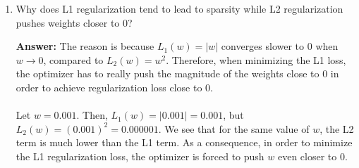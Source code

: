 \documentclass{article}
\newenvironment{QandA}{\begin{enumerate}[label=\arabic*.]}{\end{enumerate}}
\newenvironment{ListAlph}{\begin{enumerate}[label=(\alph*)]}{\end{enumerate}}
\newenvironment{answer}{\par\normalfont \textbf{Answer:}}{}
\newcommand{\Exp}[1]{\mathbb{E}\left[ #1 \right]}
\newcommand{\Cov}[1]{\text{Cov}\left[ #1 \right]}
\begin{document}
\begin{QandA}
\begin{answer}
\begin{ListAlph}
            Then, the error becomes:
            \begin{align*}
                \Exp{\left( \frac{1}{K} \sum_{k} \epsilon_k \right)^2} &= \frac{1}{K}v + \frac{K-1}{K}c \\
                &= \frac{1}{K}v + \frac{K-1}{K}v & (c = v) \\
                &= v \\ 
                &= \Exp{\epsilon_k^2}
            \end{align*}
            In other words, we observe no gain wrt. a single model when the errors of the models are correlated.
    
            \item The errors are uncorrelated:
            \begin{align*}
                corr(\epsilon_k, \epsilon_l) &= 0 \\
                \implies \Cov{\epsilon_k, \epsilon_l} &= 0 \\
                \implies c &= 0
            \end{align*}
            In this case, the error becomes:
            \begin{align*}
                \Exp{\left( \frac{1}{K} \sum_{k} \epsilon_k \right)^2} &= \frac{1}{K}v + \frac{K-1}{K}c \\
                &= \frac{1}{K}v  & (c = 0) \\
                &= \frac{\Exp{\epsilon_k^2}}{K}
            \end{align*}
            In contrast to before, we notice a $K$-fold reduction in the error wrt. a single model.
        \end{ListAlph}
        
    \end{answer}
    
    \item Why does L1 regularization tend to lead to sparsity while L2 regularization pushes weights closer to 0?
    \begin{answer}
        The reason is because $L_1(w) = \vert w \vert$ converges slower to $0$ when $w \rightarrow 0$, compared to  $L_2(w)=w^2$. Therefore, when minimizing the L1 loss, the optimizer has to really push the magnitude of the weights close to $0$ in order to achieve regularization loss close to $0$. \\\\
        Let $w = 0.001$. Then, $L_1(w) = \vert 0.001 \vert = 0.001$, but $L_2(w) = (0.001)^2 = 0.000001$. We see that for the same value of $w$, the L2 term is much lower than the L1 term. As a consequence, in order to minimize the L1 regularization loss, the optimizer is forced to push $w$ even closer to $0$.
    \end{answer}
    

\end{QandA}
\end{document}
